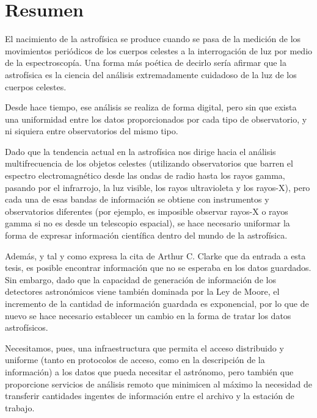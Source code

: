 \chapter*[Resumen]{Resumen}
\label{resumen}

	
	El nacimiento de la astrofísica se produce cuando se pasa de
	la medición de los movimientos periódicos de los cuerpos
	celestes a la interrogación de luz por medio de la
	espectroscopía. Una forma más poética de decirlo sería
	afirmar que la astrofísica es la ciencia del análisis
	extremadamente cuidadoso de la luz de los cuerpos celestes.
	
	Desde hace tiempo, ese análisis se realiza de forma digital,
	pero sin que exista una uniformidad entre los datos
	proporcionados por cada tipo de observatorio, y ni siquiera
	entre observatorios del mismo tipo.
	
	Dado que la tendencia actual en la astrofísica nos dirige 
	hacia el análisis multifrecuencia de los objetos celestes
	(utilizando observatorios que barren el espectro
	electromagnético desde las ondas de radio hasta los rayos
	gamma, pasando por el infrarrojo, la luz visible, los rayos
	ultravioleta y los rayos-X), pero cada una de esas bandas de
	información se obtiene con instrumentos y observatorios
	diferentes (por ejemplo, es imposible observar rayos-X o 
	rayos gamma si no es desde un telescopio espacial), se
	hace necesario uniformar la forma de expresar información
	científica dentro del mundo de la astrofísica.
	
	Además, y tal y como expresa la cita de Arthur C. Clarke
	que da entrada a esta tesis, es posible encontrar información
	que no se esperaba en los datos guardados. Sin embargo, dado 
	que la capacidad de generación de información de los detectores
	astronómicos viene también dominada por la Ley de Moore, el
	incremento de la cantidad de información guardada es
	exponencial, por lo que de nuevo se hace necesario establecer
	un cambio en la forma de tratar los datos astrofísicos.
	
	Necesitamos, pues, una infraestructura que permita el acceso
	distribuido y uniforme (tanto en protocolos de acceso, como en
	la descripción de la información) a los datos que pueda
	necesitar el astrónomo, pero también que proporcione servicios
	de análisis remoto que minimicen al máximo la necesidad de
	transferir cantidades ingentes de información entre el archivo
	y la estación de trabajo.
	
